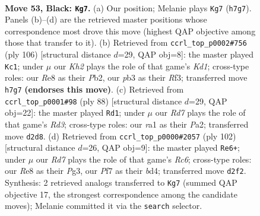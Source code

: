 \documentclass[11pt]{article}
\begin{document}
\clearpage

\begin{figure}[p]\centering
\begin{subfigure}{0.46\textwidth}\centering
\resizebox{\linewidth}{!}{%
\newchessgame
\chessboard[
  setfen={4r3/5p1k/6p1/1R6/7P/1P6/2Pr2b1/R2B2K1 b - - 2 53},
  showmover=false,
  pgfstyle=straightmove, color=movearrow, markmove={h7-g7}
]}
\caption{}
\end{subfigure}\hfill
\begin{subfigure}{0.46\textwidth}\centering
\resizebox{\linewidth}{!}{%
\newchessgame
\chessboard[
  setfen={6k1/1p3b1p/7B/1r4p1/6P1/5R1P/1P6/3K4 w - - 6 54},
  showmover=false,
  pgfstyle=straightmove, color=movearrow, markmove={d1-c1}
]}
\caption{}
\end{subfigure}
\\[4pt]
\begin{subfigure}{0.46\textwidth}\centering
\resizebox{\linewidth}{!}{%
\newchessgame
\chessboard[
  setfen={8/2kp4/8/2r2p2/1p3P2/1BbR1K2/P7/8 w - - 17 45},
  showmover=false,
  pgfstyle=straightmove, color=movearrow, markmove={d3-d1}
]}
\caption{}
\end{subfigure}\hfill
\begin{subfigure}{0.46\textwidth}\centering
\resizebox{\linewidth}{!}{%
\newchessgame
\chessboard[
  setfen={7r/8/1pR4p/p3k3/P1Bb4/6P1/6K1/8 w - - 17 52},
  showmover=false,
  pgfstyle=straightmove, color=movearrow, markmove={c6-e6}
]}
\caption{}
\end{subfigure}
\caption{\textbf{Move 53, Black: \texttt{Kg7}.} (a) Our position; Melanie plays \texttt{Kg7} (\texttt{h7g7}). Panels (b)--(d) are the retrieved master positions whose correspondence most drove this move (highest QAP objective among those that transfer to it). (b) Retrieved from \texttt{ccrl\_top\_p0002\#756} (ply 106) [structural distance $d$=29, QAP obj=8]: the master played \texttt{Kc1}; under $\mu$ our \emph{Kh2} plays the role of that game's \emph{Kd1}; cross-type roles: our \emph{R}e8 as their \emph{P}b2, our \emph{p}b3 as their \emph{R}f3; transferred move \texttt{h7g7} \textbf{(endorses this move)}. (c) Retrieved from \texttt{ccrl\_top\_p0001\#98} (ply 88) [structural distance $d$=29, QAP obj=22]: the master played \texttt{Rd1}; under $\mu$ our \emph{Rd7} plays the role of that game's \emph{Rd3}; cross-type roles: our \emph{r}a1 as their \emph{P}a2; transferred move \texttt{d2d8}. (d) Retrieved from \texttt{ccrl\_top\_p0000\#2057} (ply 102) [structural distance $d$=26, QAP obj=9]: the master played \texttt{Re6+}; under $\mu$ our \emph{Rd7} plays the role of that game's \emph{Rc6}; cross-type roles: our \emph{R}e8 as their \emph{P}g3, our \emph{P}f7 as their \emph{b}d4; transferred move \texttt{d2f2}. Synthesis: 2 retrieved analogs transferred to \texttt{Kg7} (summed QAP objective 17, the strongest correspondence among the candidate moves); Melanie committed it via the \texttt{search} selector.}
\label{fig:thought-m105}
\end{figure}
\end{document}
